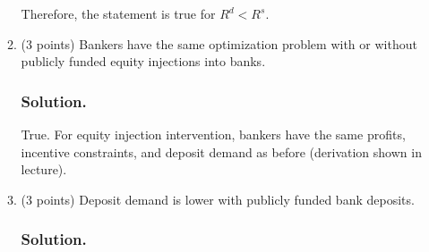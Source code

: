 \documentclass[12pt]{article}
\begin{document}
\begin{enumerate}
\begin{enumerate}
         Therefore, the statement is true for $R^d<R^s$.
        
    
     \item (3 points) Bankers have the same optimization problem with or without publicly funded
        equity injections into banks.
        \subsubsection*{Solution.}

        True. For equity injection intervention, bankers have the same profits, incentive constraints, and deposit demand as before (derivation shown in lecture). 
    
     
     \item (3 points) Deposit demand is lower with publicly funded bank deposits.
     \subsubsection*{Solution.}


\end{enumerate}
\end{enumerate}
\end{document}
